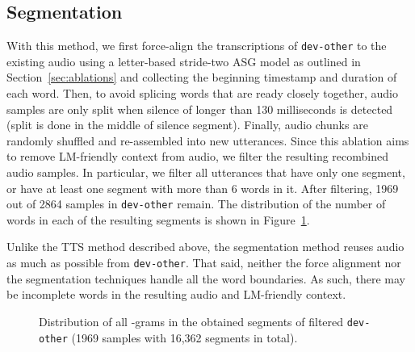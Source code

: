 \documentclass{article}
\def\devother{\texttt{dev-other}}
\begin{document}
\subsection{Segmentation}
With this method, we first force-align the transcriptions of \devother{} to the existing audio using a letter-based stride-two ASG model as outlined in Section~\ref{sec:ablations} and collecting the beginning timestamp and duration of each word. Then, to avoid splicing words that are ready closely together, audio samples are only split when silence of longer than 130 milliseconds is detected (split is done in the middle of silence segment). Finally, audio chunks are randomly shuffled and re-assembled into new utterances. Since this ablation aims to remove LM-friendly context from audio, we filter the resulting recombined audio samples. In particular, we filter all utterances that have only one segment, or have at least one segment with more than 6 words in it. After filtering, 1969 out of 2864 samples in \devother{} remain. The distribution of the number of words in each of the resulting segments is shown in Figure~\ref{fig:segngramappendix}. 

Unlike the TTS method described above, the segmentation method reuses audio as much as possible from \devother{}. That said, neither the force alignment nor the segmentation techniques handle all the word boundaries. As such, there may be incomplete words in the resulting audio and LM-friendly context.    

\begin{figure}[h!]
\centering
{}
\caption{\label{fig:segngramappendix}Distribution of all -grams in the obtained segments of filtered \devother{} (1969 samples with 16,362 segments in total).}
\end{figure}
\end{document}

